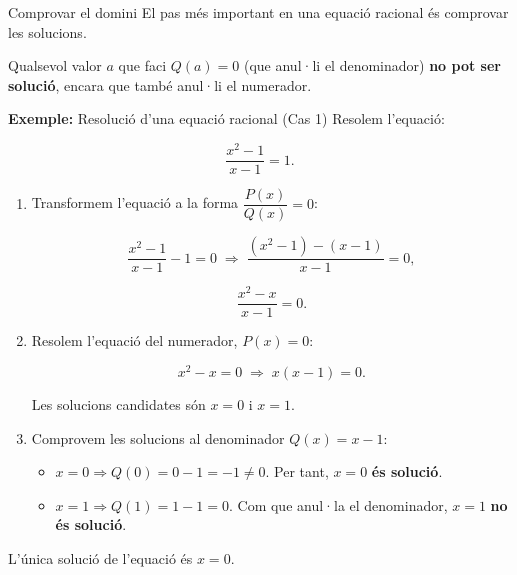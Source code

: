 \begin{nota}{Comprovar el domini}
El pas més important en una equació racional és comprovar les solucions.

Qualsevol valor $a$ que faci $Q(a)=0$ (que anul·li el denominador) \textbf{no pot ser solució}, encara que també anul·li el numerador.
\end{nota}

\begin{exemple}{\textbf{Exemple:} Resolució d'una equació racional (Cas 1)}
Resolem l'equació:

\[
\frac{x^2-1}{x-1} = 1.
\]

\begin{enumerate}
\item Transformem l'equació a la forma $\dfrac{P(x)}{Q(x)}=0$:

\[
\frac{x^2-1}{x-1} - 1 = 0 \;\Rightarrow\; \frac{(x^2-1)-(x-1)}{x-1}=0,
\]

\[
\frac{x^2-x}{x-1} = 0.
\]
\item Resolem l'equació del numerador, $P(x)=0$:

\[
x^2-x=0 \;\Rightarrow\; x(x-1)=0.
\]

Les solucions candidates són $x=0$ i $x=1$.
\item Comprovem les solucions al denominador $Q(x)=x-1$:

\begin{itemize}
\item $x=0 \Rightarrow Q(0) = 0-1 = -1 \neq 0$. Per tant, $x=0$ \textbf{és solució}.
\item $x=1 \Rightarrow Q(1) = 1-1 = 0$. Com que anul·la el denominador, $x=1$ \textbf{no és solució}.
\end{itemize}
\end{enumerate}

L'única solució de l'equació és $x=0$.
\end{exemple}

